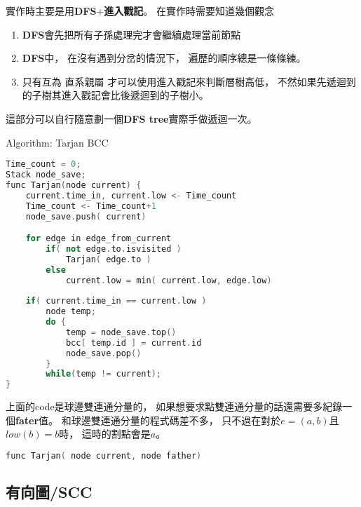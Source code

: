 \documentclass[12pt,oneside]{article}
\begin{document}
實作時主要是用\textbf{DFS}+\textbf{進入戳記}。
在實作時需要知道幾個觀念

\begin{adjustwidth}{2em}{0em}
\begin{enumerate}
    \item 
        \textbf{DFS}會先把所有子孫處理完才會繼續處理當前節點 \label{concept_1}
    \item 
        \textbf{DFS}中，
        在沒有遇到分岔的情況下，
        遍歷的順序總是一條條練。 \label{concept_2}
    \item 
        只有互為{\color{red} 直系親屬} 才可以使用進入戳記來判斷層樹高低，
        不然如果先遞迴到的子樹其進入戳記會比後遞迴到的子樹小。 \label{concept_3}
\end{enumerate}
\end{adjustwidth}

這部分可以自行隨意劃一個\textbf{DFS tree}實際手做遞迴一次。

\vspace*{2em}
\begin{center}
    Algorithm: Tarjan BCC
\end{center}
\begin{lstlisting}[language=C++,escapeinside=``]
Time_count = 0;
Stack node_save;
func Tarjan(node current) {
    current.time_in, current.low <- Time_count
    Time_count <- Time_count+1
    node_save.push( current)

    for edge in edge_from_current 
        if( not edge.to.isvisited )
            Tarjan( edge.to )
        else   
            current.low = min( current.low, edge.low) 
        
    if( current.time_in == current.low ) 
        node temp;
        do {
            temp = node_save.top()
            bcc[ temp.id ] = current.id 
            node_save.pop()
        }
        while(temp != current);
}
\end{lstlisting}
\vspace*{2em}

上面的code是球邊雙連通分量的，
如果想要求點雙連通分量的話還需要多紀錄一個\textbf{fater}值。
和球邊雙連通分量的程式碼差不多，
只不過在對於$e=(a, b)$且$low( b ) = b$時，
這時的割點會是$a$。

\begin{lstlisting}[language=C++,escapeinside=``]
func Tarjan( node current, node father)
\end{lstlisting}

\subsection{有向圖/SCC}
\end{document}
